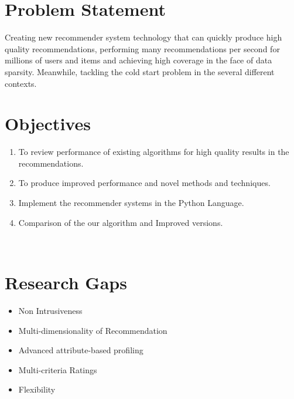 \documentclass[12pt,a4paper]{article}
\begin{document}
	
	
	\newpage
	\section{Problem Statement}

	Creating new recommender system technology that can quickly produce high quality recommendations, performing many recommendations per second for millions of users and items and achieving high coverage in the face of data sparsity. Meanwhile, tackling the cold start problem in the several different contexts.
	
	\section{Objectives}
	\begin{enumerate}
		\item{To review performance of existing algorithms for high quality results in the recommendations.}
		\item{To produce improved performance and novel methods and techniques.}
		\item{Implement the recommender systems in the Python Language.}
		\item{Comparison of the our algorithm and Improved versions.}
	\end{enumerate}
	\textbf{}\\
	
	\newpage
	\section{Research Gaps}
	\begin{itemize}
	\item{Non Intrusiveness}
	
	\item{Multi-dimensionality of Recommendation}
	
	\item{Advanced attribute-based profiling }
	
	\item{Multi-criteria Ratings}
	
	\item{Flexibility}
	
	
	\end{itemize}



	
	 
	
	\newpage
	
	
	
\end{document}
